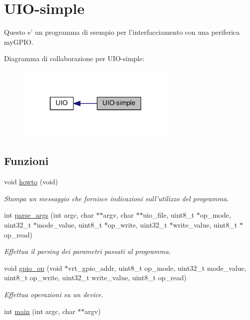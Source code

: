 \hypertarget{group___u_i_o-simple}{\section{U\+I\+O-\/simple}
\label{group___u_i_o-simple}
}


Questo e' un programma di esempio per l'interfacciamento con una periferica my\+G\+P\+I\+O.  


Diagramma di collaborazione per U\+I\+O-\/simple\+:\nopagebreak
\begin{figure}[H]
\begin{center}
\leavevmode
\includegraphics[width=217pt]{group___u_i_o-simple}
\end{center}
\end{figure}
\subsection*{Funzioni}
\begin{DoxyCompactItemize}
\item 
void \hyperlink{group___u_i_o-simple_ga05909651fa170a63e98e3f8e13451b7b}{howto} (void)
\begin{DoxyCompactList}\small\item\em Stampa un messaggio che fornisce indicazioni sull'utilizzo del programma. \end{DoxyCompactList}\item 
int \hyperlink{group___u_i_o-simple_ga15f7e5adb83963e5d21ccea3186b5364}{parse\+\_\+args} (int argc, char $\ast$$\ast$argv, char $\ast$$\ast$uio\+\_\+file, uint8\+\_\+t $\ast$op\+\_\+mode, uint32\+\_\+t $\ast$mode\+\_\+value, uint8\+\_\+t $\ast$op\+\_\+write, uint32\+\_\+t $\ast$write\+\_\+value, uint8\+\_\+t $\ast$op\+\_\+read)
\begin{DoxyCompactList}\small\item\em Effettua il parsing dei parametri passati al programma. \end{DoxyCompactList}\item 
void \hyperlink{group___u_i_o-simple_ga879d8b839631449ecb5bc4d0721432b6}{gpio\+\_\+op} (void $\ast$vrt\+\_\+gpio\+\_\+addr, uint8\+\_\+t op\+\_\+mode, uint32\+\_\+t mode\+\_\+value, uint8\+\_\+t op\+\_\+write, uint32\+\_\+t write\+\_\+value, uint8\+\_\+t op\+\_\+read)
\begin{DoxyCompactList}\small\item\em Effettua operazioni su un device. \end{DoxyCompactList}\item 
int \hyperlink{group___u_i_o-simple_ga3c04138a5bfe5d72780bb7e82a18e627}{main} (int argc, char $\ast$$\ast$argv)
\end{DoxyCompactItemize}


